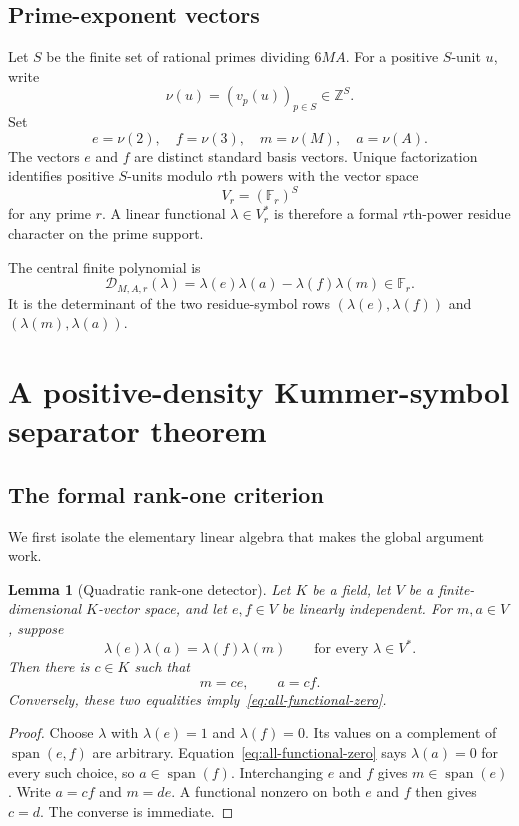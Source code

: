 \documentclass[11pt,oneside]{article}
\newtheorem{lemma}[theorem]{Lemma}
\theoremstyle{definition}
\theoremstyle{remark}
\newcommand{\Z}{\mathbb Z}
\newcommand{\F}{\mathbb F}
\newcommand{\Span}{\operatorname{span}}
\begin{document}
\subsection{Prime-exponent vectors}

Let $S$ be the finite set of rational primes dividing $6MA$.  For a positive $S$-unit $u$,
write
\[
 \nu(u)=(v_p(u))_{p\in S}\in\Z^S.
\]
Set
\[
 e=\nu(2),\quad f=\nu(3),\quad m=\nu(M),\quad a=\nu(A).
\]
The vectors $e$ and $f$ are distinct standard basis vectors.  Unique factorization identifies
positive $S$-units modulo $r$th powers with the vector space
\[
 V_r=(\F_r)^S
\]
for any prime $r$.  A linear functional $\lambda\in V_r^*$ is therefore a formal
$r$th-power residue character on the prime support.

The central finite polynomial is
\begin{equation}
 \mathscr D_{M,A,r}(\lambda)
 =\lambda(e)\lambda(a)-\lambda(f)\lambda(m)\in\F_r.
 \label{eq:formal-kummer-det}
\end{equation}
It is the determinant of the two residue-symbol rows
$(\lambda(e),\lambda(f))$ and $(\lambda(m),\lambda(a))$.

\section{A positive-density Kummer-symbol separator theorem}
\label{sec:kummer}

\subsection{The formal rank-one criterion}

We first isolate the elementary linear algebra that makes the global argument work.

\begin{lemma}[Quadratic rank-one detector]
\label{lem:formal-rank-one}
Let $K$ be a field, let $V$ be a finite-dimensional $K$-vector space, and let
$e,f\in V$ be linearly independent.  For $m,a\in V$, suppose
\begin{equation}
 \lambda(e)\lambda(a)=\lambda(f)\lambda(m)
 \qquad\text{for every }\lambda\in V^*.
 \label{eq:all-functional-zero}
\end{equation}
Then there is $c\in K$ such that
\[
  m=ce,\qquad a=cf.
\]
Conversely, these two equalities imply~\eqref{eq:all-functional-zero}.
\end{lemma}

\begin{proof}
Choose $\lambda$ with $\lambda(e)=1$ and $\lambda(f)=0$.  Its values on a complement of
$\Span(e,f)$ are arbitrary.  Equation~\eqref{eq:all-functional-zero} says
$\lambda(a)=0$ for every such choice, so $a\in\Span(f)$.  Interchanging $e$ and $f$ gives
$m\in\Span(e)$.  Write $a=cf$ and $m=de$.  A functional nonzero on both $e$ and $f$ then
gives $c=d$.  The converse is immediate.
\end{proof}
\end{document}
